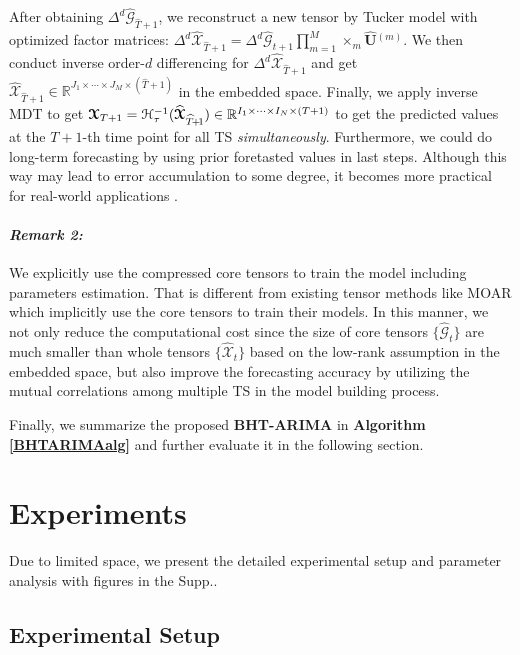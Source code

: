 \documentclass[letterpaper]{article} %
\numberwithin{theorem}{section}
\newcommand{\ten}[1]{ \boldsymbol{\mathcal #1}}
\newcommand{\bbR}[1]{\mathbb{R}^{#1}}
\begin{document}
After obtaining $ \Delta^d  {\widehat{\ten{G}}_{\widehat{T}+1}}$, we reconstruct a new tensor by Tucker model with optimized factor matrices:  
$\Delta^d  {\widehat{\ten{X}}_{\widehat{T}+1}} =  \Delta^d  {\widehat{\ten{G}}_{{t}+1}}   \prod_{m=1}^M \times_m  \widehat{ \mathbf U}{^{(m)}} $. We then  
conduct inverse order-$d$  differencing  for   $ \Delta^d  {\widehat{\ten{X}}_{\widehat{T}+1}}$ and get   $ {\widehat{\ten{X}}_{\widehat{T}+1}}\in \bbR{J_1 \times \cdots \times J_M \times {(\widehat{T}+1)}} $  in the embedded space. Finally,  we  apply  inverse MDT to get ${{\ten{X}}_{T+1}}  = \mathcal{H}_\tau^{-1}({\widehat{\ten{X}}_{\widehat{T}\hspace{-0.05cm}+\hspace{-0.05cm}1}})   \in \bbR{I_1 \times \cdots \times I_N \times {(T+1)}} $ to get the predicted values at the  $T+1$-th time point for all TS \textit{simultaneously}. Furthermore, we could do long-term forecasting by using prior foretasted values in last steps. Although this way may lead to error accumulation to some degree, it becomes more practical for real-world applications \cite{jing2018high}. 

\paragraph{\textit{Remark 2:}}   We  explicitly use the compressed core tensors to train the model including   parameters estimation. That is different from existing tensor methods  like MOAR which implicitly use the core tensors to train their models.  In this manner, we not only reduce the computational cost since the size of core tensors $\{\widehat{\ten{G}}_{t} \} $  are much smaller than whole tensors $\{\widehat{\ten{X}}_{t} \} $ based on the low-rank assumption in the embedded space, but also  improve the forecasting accuracy by  utilizing the mutual correlations  among multiple TS in the model building process.  

Finally, we summarize
the proposed \textbf{BHT-ARIMA} in \textbf{Algorithm} \textbf{\ref{BHTARIMAalg}} and further evaluate it in the following section. 


\section{Experiments}
Due to limited space,  we  present the detailed experimental setup and  parameter analysis  with   figures  in the  Supp.. 
\subsection{Experimental Setup}
\end{document}
